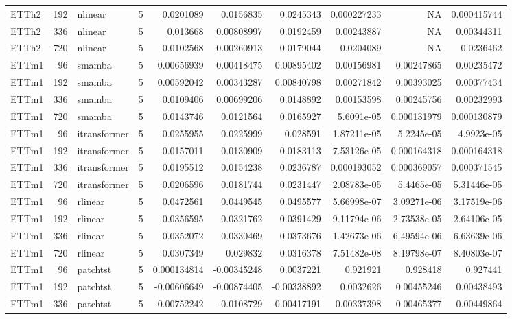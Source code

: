 \begin{longtable}{lrllrrrrrr}
ETTh2 & 192 & nlinear & 5 & 0.0201089 & 0.0156835 & 0.0245343 & 0.000227233 & NA & 0.000415744 \\
ETTh2 & 336 & nlinear & 5 & 0.013668 & 0.00808997 & 0.0192459 & 0.00243887 & NA & 0.00344311 \\
ETTh2 & 720 & nlinear & 5 & 0.0102568 & 0.00260913 & 0.0179044 & 0.0204089 & NA & 0.0236462 \\
ETTm1 & 96 & smamba & 5 & 0.00656939 & 0.00418475 & 0.00895402 & 0.00156981 & 0.00247865 & 0.00235472 \\
ETTm1 & 192 & smamba & 5 & 0.00592042 & 0.00343287 & 0.00840798 & 0.00271842 & 0.00393025 & 0.00377434 \\
ETTm1 & 336 & smamba & 5 & 0.0109406 & 0.00699206 & 0.0148892 & 0.00153598 & 0.00245756 & 0.00232993 \\
ETTm1 & 720 & smamba & 5 & 0.0143746 & 0.0121564 & 0.0165927 & 5.6091e-05 & 0.000131979 & 0.000130879 \\
ETTm1 & 96 & itransformer & 5 & 0.0255955 & 0.0225999 & 0.028591 & 1.87211e-05 & 5.2245e-05 & 4.9923e-05 \\
ETTm1 & 192 & itransformer & 5 & 0.0157011 & 0.0130909 & 0.0183113 & 7.53126e-05 & 0.000164318 & 0.000164318 \\
ETTm1 & 336 & itransformer & 5 & 0.0195512 & 0.0154238 & 0.0236787 & 0.000193052 & 0.000369057 & 0.000371545 \\
ETTm1 & 720 & itransformer & 5 & 0.0206596 & 0.0181744 & 0.0231447 & 2.08783e-05 & 5.4465e-05 & 5.31446e-05 \\
ETTm1 & 96 & rlinear & 5 & 0.0472561 & 0.0449545 & 0.0495577 & 5.66998e-07 & 3.09271e-06 & 3.17519e-06 \\
ETTm1 & 192 & rlinear & 5 & 0.0356595 & 0.0321762 & 0.0391429 & 9.11794e-06 & 2.73538e-05 & 2.64106e-05 \\
ETTm1 & 336 & rlinear & 5 & 0.0352072 & 0.0330469 & 0.0373676 & 1.42673e-06 & 6.49594e-06 & 6.63639e-06 \\
ETTm1 & 720 & rlinear & 5 & 0.0307349 & 0.029832 & 0.0316378 & 7.51482e-08 & 8.19798e-07 & 8.40803e-07 \\
ETTm1 & 96 & patchtst & 5 & 0.000134814 & -0.00345248 & 0.0037221 & 0.921921 & 0.928418 & 0.927441 \\
ETTm1 & 192 & patchtst & 5 & -0.00606649 & -0.00874405 & -0.00338892 & 0.0032626 & 0.00455246 & 0.00438493 \\
ETTm1 & 336 & patchtst & 5 & -0.00752242 & -0.0108729 & -0.00417191 & 0.00337398 & 0.00465377 & 0.00449864 \\

\end{longtable}
